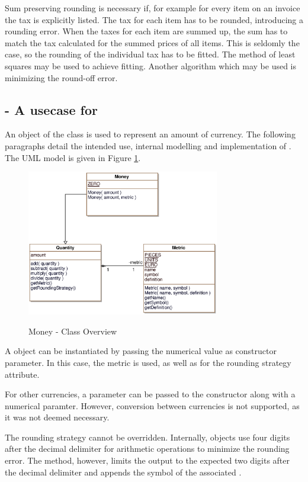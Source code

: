 Sum preserving rounding is necessary if, for example for every item on an invoice the tax is explicitly listed.
The tax for each item has to be rounded, introducing a rounding error.
When the taxes for each item are summed up, the sum has to match the tax calculated for the summed prices of all items.
This is seldomly the case, so the rounding of the individual tax has to be fitted.
The method of least squares may be used to achieve fitting.
Another algorithm which may be used is minimizing the round-off error.

\subsection{ - A usecase for }
An object of the class  is used to represent an amount of currency.
The following paragraphs detail the intended use, internal modelling and implementation of .
The UML model is given in Figure \ref{money_overview}.

\begin{figure}[ht]
	\centering
  \includegraphics[width=0.75\textwidth]{images/Money_Overview.eps}
	\label{money_overview}
	\caption{Money - Class Overview}
\end{figure}

A  object can be instantiated by passing the numerical value as constructor parameter.
In this case, the metric  is used, as well as  for the rounding strategy attribute.

For other currencies, a  parameter can be passed to the constructor along with a numerical paramter.
However, conversion between currencies is not supported, as it was not deemed necessary.

The rounding strategy cannot be overridden.
Internally,  objects use four digits after the decimal delimiter for arithmetic operations to minimize the rounding error.
The  method, however, limits the output to the expected two digits after the decimal delimiter and appends the symbol of the associated .

